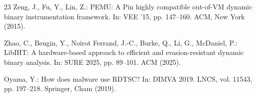 \documentclass[pdflatex,sn-mathphys-num]{sn-jnl}
\theoremstyle{thmstyleone}
\theoremstyle{thmstyletwo}
\theoremstyle{thmstylethree}
\begin{document}
\begin{thebibliography}{23}
Zeng, J., Fu, Y., Lin, Z.:
PEMU: A Pin highly compatible out-of-VM dynamic binary instrumentation framework.
In: VEE '15, pp. 147--160. ACM, New York (2015).

Zhao, C., Beugin, Y., Noirot Ferrand, J.-C., Burke, Q., Li, G., McDaniel, P.:
LibIHT: A hardware-based approach to efficient and evasion-resistant dynamic binary analysis.
In: SURE 2025, pp. 89--101. ACM (2025).

Oyama, Y.:
How does malware use RDTSC?
In: DIMVA 2019. LNCS, vol. 11543, pp. 197--218. Springer, Cham (2019).

\end{thebibliography}
\end{document}

